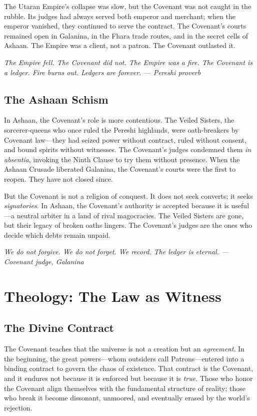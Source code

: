\documentclass{book}
\newcommand{\citation}[1]{\textcolor{marginalia}{\small\textit{#1}}}
\begin{document}
The Utaran Empire's collapse was slow, but the Covenant was not caught in the rubble. Its judges had always served both emperor and merchant; when the emperor vanished, they continued to serve the contract. The Covenant's courts remained open in Galanina, in the Fhara trade routes, and in the secret cells of Ashaan. The Empire was a client, not a patron. The Covenant outlasted it.

\citation{The Empire fell. The Covenant did not. The Empire was a fire. The Covenant is a ledger. Fire burns out. Ledgers are forever. --- Pereshi proverb}

\section{The Ashaan Schism}

In Ashaan, the Covenant's role is more contentious. The Veiled Sisters, the sorcerer-queens who once ruled the Pereshi highlands, were oath-breakers by Covenant law---they had seized power without contract, ruled without consent, and bound spirits without witnesses. The Covenant's judges condemned them \textit{in absentia}, invoking the Ninth Clause to try them without presence. When the Ashaan Crusade liberated Galanina, the Covenant's courts were the first to reopen. They have not closed since.

But the Covenant is not a religion of conquest. It does not seek converts; it seeks \textit{signatories}. In Ashaan, the Covenant's authority is accepted because it is useful---a neutral arbiter in a land of rival magocracies. The Veiled Sisters are gone, but their legacy of broken oaths lingers. The Covenant's judges are the ones who decide which debts remain unpaid.

\citation{We do not forgive. We do not forget. We record. The ledger is eternal. --- Covenant judge, Galanina}

\chapter{Theology: The Law as Witness}

\section{The Divine Contract}

The Covenant teaches that the universe is not a creation but an \textit{agreement}. In the beginning, the great powers---whom outsiders call Patrons---entered into a binding contract to govern the chaos of existence. That contract is the Covenant, and it endures not because it is enforced but because it is \textit{true}. Those who honor the Covenant align themselves with the fundamental structure of reality; those who break it become dissonant, unmoored, and eventually erased by the world's rejection.
\end{document}
